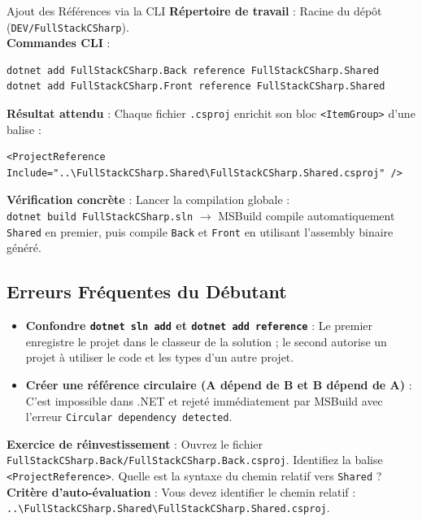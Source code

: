 \begin{bestpracticebox}{Ajout des Références via la CLI}
\textbf{Répertoire de travail} : Racine du dépôt (\texttt{DEV/FullStackCSharp}).\\[2pt]
\textbf{Commandes CLI} :
\begin{verbatim}
dotnet add FullStackCSharp.Back reference FullStackCSharp.Shared
dotnet add FullStackCSharp.Front reference FullStackCSharp.Shared
\end{verbatim}
\textbf{Résultat attendu} : Chaque fichier \texttt{.csproj} enrichit son bloc \texttt{<ItemGroup>} d'une balise :
\begin{verbatim}
<ProjectReference Include="..\FullStackCSharp.Shared\FullStackCSharp.Shared.csproj" />
\end{verbatim}
\textbf{Vérification concrète} : Lancer la compilation globale :\\
\texttt{dotnet build FullStackCSharp.sln} $\longrightarrow$ MSBuild compile automatiquement \texttt{Shared} en premier, puis compile \texttt{Back} et \texttt{Front} en utilisant l'assembly binaire généré.
\end{bestpracticebox}

\vspace{0.2cm}

\subsection*{Erreurs Fréquentes du Débutant}

\begin{itemize}
    \item \textbf{Confondre \texttt{dotnet sln add} et \texttt{dotnet add reference}} : Le premier enregistre le projet dans le classeur de la solution ; le second autorise un projet à utiliser le code et les types d'un autre projet.
    \item \textbf{Créer une référence circulaire (A dépend de B et B dépend de A)} : C'est impossible dans .NET et rejeté immédiatement par MSBuild avec l'erreur \texttt{Circular dependency detected}.
\end{itemize}

\vspace{0.2cm}

\begin{tcolorbox}[colback=emerald!4!white,colframe=emerald!40!white,arc=2mm,boxrule=0.8pt,top=2.5mm,bottom=2.5mm,left=3mm,right=3mm]
    \small\textbf{\color{emerald!80!black}Exercice de réinvestissement} :
    Ouvrez le fichier \texttt{FullStackCSharp.Back/FullStackCSharp.Back.csproj}. Identifiez la balise \texttt{<ProjectReference>}. Quelle est la syntaxe du chemin relatif vers \texttt{Shared} ?\\
    \textbf{Critère d'auto-évaluation} : Vous devez identifier le chemin relatif : \texttt{..\textbackslash FullStackCSharp.Shared\textbackslash FullStackCSharp.Shared.csproj}.
\end{tcolorbox}


